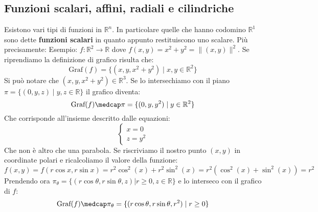 \subsection{Funzioni scalari, affini, radiali e cilindriche}
Esistono vari tipi di funzioni in $\mathbb{R}^n$. In particolare quelle che hanno codomino $\mathbb{R}^1$ sono dette \textbf{funzioni scalari} in quanto appunto restituiscono uno scalare. Più precisamente:
Esempio: $f: \mathbb{R}^2 \to \mathbb{R}$ dove $f(x, y) = x^2 + y^2 = \lVert (x, y) \rVert ^2$. Se riprendiamo la definizione di grafico risulta che:
\begin{equation*}
	\text{Graf}(f) = \{(x, y, x^2 + y^2) \; | \; x, y \in \mathbb{R}^2\}
\end{equation*}
Si può notare che $(x, y, x^2 + y^2) \in \mathbb{R}^3$. Se lo intersechiamo con il piano $\pi = \{(0, y, z) \; | \; y, z \in \mathbb{R}\}$ il grafico diventa:
\begin{equation*}
	\text{Graf}(f) \medcap \pi = \{(0, y, y^2) \; | \; y \in \mathbb{R}^2\}
\end{equation*}
Che corrisponde all'insieme descritto dalle equazioni:
\begin{equation*}
	\begin{cases}
		x = 0\\
		z = y^2
	\end{cases}
\end{equation*}
Che non è altro che una parabola. %
Se riscriviamo il nostro punto $(x, y)$ in coordinate polari e ricalcoliamo il valore della funzione:
\begin{equation*}
	f(x, y) = f(r\cos{x}, r\sin{x}) = r^2\cos^2(x) + r^2\sin^2(x) = r^2(\cos^2(x) + \sin^2(x)) = r^2
\end{equation*}
Prendendo ora $\pi_\theta = \{(r\cos{\theta}, r\sin\theta, z) | r \geq 0, z \in \mathbb{R}\}$ e lo interseco con il grafico di $f$:
\begin{equation*}
	\text{Graf}(f) \medcap \pi_\theta = \{(r\cos{\theta}, r\sin\theta, r^2) \; | \; r \geq 0\}
\end{equation*}

